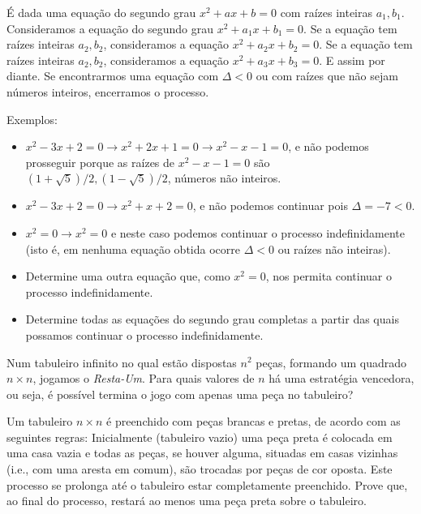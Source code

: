 \begin{questao}
  É dada uma equação do segundo grau $x^2+ax+b=0$ com raízes inteiras
  $a_1,b_1$. Consideramos a equação do segundo grau $x^2+a_1x+b_1=0$. Se a
  equação tem raízes inteiras $a_2,b_2$, consideramos a equação
  $x^2+a_2x+b_2=0$. Se a equação tem raízes inteiras $a_2,b_2$, consideramos a
  equação $x^2+a_3x+b_3=0$. E assim por diante. Se encontrarmos uma equação com
  $\Delta < 0$ ou com raízes que não sejam números inteiros, encerramos o
  processo.

  Exemplos:
  \begin{itemize}
  \item $x^2-3x+2=0 \rightarrow x^2+2x+1=0 \rightarrow x^2-x-1=0$, e não podemos
    prosseguir porque as raízes de $x^2-x-1=0$ são
    $(1+\sqrt{5})/2,(1-\sqrt{5})/2$, números não inteiros.

  \item $x^2-3x+2=0 \rightarrow x^2+x+2=0$, e não podemos continuar pois $\Delta
    = -7 < 0$.

  \item $x^2=0 \rightarrow x^2=0$ e neste caso podemos continuar o processo
    indefinidamente (isto é, em nenhuma equação obtida ocorre $\Delta<0$ ou
    raízes não inteiras).
  \end{itemize}

  \begin{itemize}
  \item Determine uma outra equação que, como $x^2=0$, nos permita continuar o
    processo indefinidamente.

  \item Determine todas as equações do segundo grau completas a partir das quais
    possamos continuar o processo indefinidamente.
  \end{itemize}  
\end{questao}

\begin{questao}
  Num tabuleiro infinito no qual estão dispostas $n^2$ peças, formando um
  quadrado $n \times n$, jogamos o {\it Resta-Um}. Para quais valores de $n$ há
  uma estratégia vencedora, ou seja, é possível termina o jogo com apenas uma
  peça no tabuleiro?

\end{questao}

\begin{questao}
  Um tabuleiro $n \times n$ é preenchido com peças brancas e pretas, de acordo
  com as seguintes regras: Inicialmente (tabuleiro vazio) uma peça preta é
  colocada em uma casa vazia e todas as peças, se houver alguma, situadas em
  casas vizinhas (i.e., com uma aresta em comum), são trocadas por peças de cor
  oposta. Este processo se prolonga até o tabuleiro estar completamente
  preenchido. Prove que, ao final do processo, restará ao menos uma peça preta
  sobre o tabuleiro.

\end{questao}

